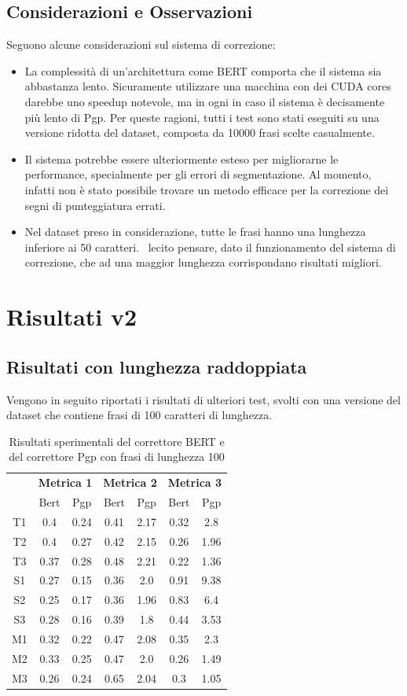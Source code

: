 \documentclass[12pt]{article}
\begin{document}
\subsection{Considerazioni e Osservazioni}
Seguono alcune considerazioni sul sistema di correzione:
\begin{itemize}
\item La complessità di un'architettura come BERT comporta che il sistema sia abbastanza lento. Sicuramente utilizzare una macchina con dei CUDA cores darebbe uno speedup notevole, ma in ogni in caso il sistema è decisamente più lento di Pgp. Per queste ragioni, tutti i test sono stati eseguiti su una versione ridotta del dataset, composta da 10000 frasi scelte casualmente.
\item Il sistema potrebbe essere ulteriormente esteso per migliorarne le performance, specialmente per gli errori di segmentazione. Al momento, infatti non è stato possibile trovare un metodo efficace per la correzione dei segni di punteggiatura errati.
\item Nel dataset preso in considerazione, tutte le frasi hanno una lunghezza inferiore ai 50 caratteri. \E\ lecito pensare, dato il funzionamento del sistema di correzione, che ad una maggior lunghezza corrispondano risultati migliori.
\end{itemize}

\section{Risultati v2}
\subsection{Risultati con lunghezza raddoppiata}
Vengono in seguito riportati i risultati di ulteriori test, svolti con una versione del dataset che contiene frasi di 100 caratteri di lunghezza.

\begin{table}[H]
\centering
\begin{tabular}{c|cc|cc|cc}
& \multicolumn{2}{c}{\textbf{Metrica 1}} & \multicolumn{2}{c}{\textbf{Metrica 2}} & \multicolumn{2}{c}{\textbf{Metrica 3}} \\
& Bert & Pgp & Bert & Pgp & Bert & Pgp \\ \hline
T1 & 0.4 & 0.24 & 0.41 & 2.17 & 0.32 & 2.8 \\
T2 & 0.4 & 0.27 & 0.42 & 2.15 & 0.26 & 1.96 \\
T3 & 0.37 & 0.28 & 0.48 & 2.21 & 0.22 & 1.36 \\
S1 & 0.27 & 0.15 & 0.36 & 2.0 & 0.91 & 9.38 \\
S2 & 0.25 & 0.17 & 0.36 & 1.96 & 0.83 & 6.4 \\
S3 & 0.28 & 0.16 & 0.39 & 1.8 & 0.44 & 3.53 \\
M1 & 0.32 & 0.22 & 0.47 & 2.08 & 0.35 & 2.3 \\
M2 & 0.33 & 0.25 & 0.47 & 2.0 & 0.26 & 1.49 \\
M3 & 0.26 & 0.24 & 0.65 & 2.04 & 0.3 & 1.05 \\
\end{tabular}
\caption{Risultati sperimentali del correttore BERT e del correttore Pgp con frasi di lunghezza 100}
\end{table}
\end{document}
